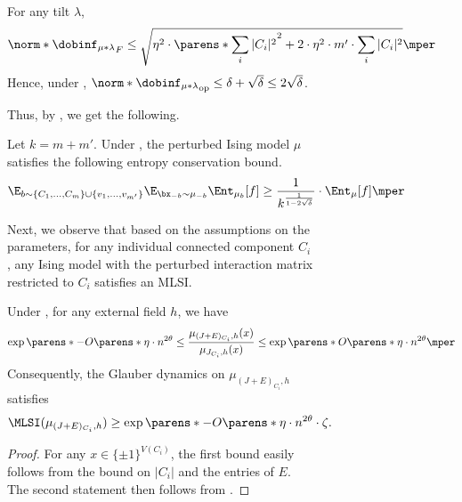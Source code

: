 \documentclass[11pt,letterpaper]{article}
\begin{document}
\begin{figure}
\begin{figure}
\begin{corollary}\label{cor:dobrushin}
    For any tilt $\lambda$,
    \[
        \norm*{\dobinf_{\mu\ast\lambda}}_F \le \sqrt{ \eta^2\cdot\parens*{\sum_i |C_i|^2}^2 + 2\cdot\eta^2 \cdot m'\cdot\sum_i |C_i|^2 }\mper
    \]
    Hence, under , $\norm*{\dobinf_{\mu\ast\lambda}}_{\mathrm{op}} \le \delta + \sqrt{\delta} \le 2\sqrt{\delta}$.
\end{corollary}

Thus, by , we get the following.

\begin{corollary}\label{cor:entropy-conservation-perturb}
    Let $k = m + m'$. Under , the perturbed Ising model $\mu$ satisfies the following entropy conservation bound.
    \[
        \E_{b\sim\{C_1,\dots,C_m\}\cup\{v_1,\dots,v_{m'}\} } \E_{\bx_{-b}\sim\mu_{-b}} \Ent_{\mu_b}[f] \ge \frac{1}{k^{\frac{1}{1-2\sqrt{\delta}}}} \cdot \Ent_{\mu}[f]\mper
    \]
\end{corollary}


Next, we observe that based on the assumptions on the parameters, for any individual connected component $C_i$, any Ising model with the perturbed interaction matrix restricted to $C_i$ satisfies an MLSI.

\begin{lemma}\label{lem:perturb-mlsi-centered}
    Under , for any external field $h$, we have 
    \[
        \exp\parens*{-O\parens*{\eta \cdot n^{2\theta}}} \le \frac{ \mu_{(J+E)_{C_i}, h}(x) }{ \mu_{J_{C_i}, h}(x) } \le \exp\parens*{O\parens*{\eta \cdot n^{2\theta}}}\mper
    \]
    Consequently, the Glauber dynamics on $\mu_{(J+E)_{C_i}, h}$ satisfies
    \[
        \MLSI(\mu_{(J+E)_{C_i}, h}) \ge \exp\parens*{-O\parens*{\eta \cdot n^{2\theta}}}\cdot\zeta.
    \]
\end{lemma}
\begin{proof}
    For any $x\in\{\pm1\}^{V(C_i)}$, the first bound easily follows from the bound on $|C_i|$ and the entries of $E$. 
    The second statement then follows from .
\end{proof}


\end{figure}
\end{figure}
\end{document}
